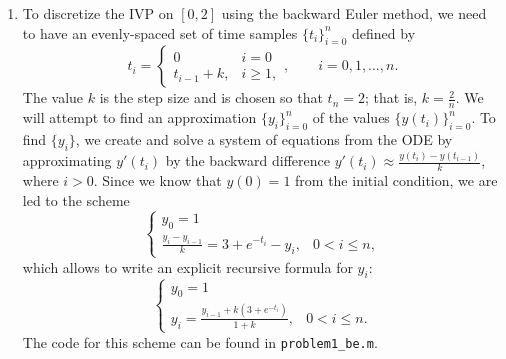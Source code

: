 \documentclass{homework}
\begin{document}
\begin{arabicparts}
		\questionpart
		\begin{enumerate}[label=({\bf\alph*})]
			\item To discretize the IVP on $[0,2]$ using the backward Euler method, we need to have an evenly-spaced set of time samples $\{t_i\}_{i=0}^n$ defined by
			\begin{equation}
				t_i = \begin{cases}
					0 & i = 0 \\
					t_{i-1} + k, & i \ge 1,
				\end{cases}, \qquad i = 0,1,\dots,n.
			\end{equation}
			The value $k$ is the step size and is chosen so that $t_n = 2$; that is, $k = \frac{2}{n}$. We will attempt to find an approximation $\{y_i\}_{i=0}^n$ of the values $\{y(t_i)\}_{i=0}^n$. To find $\{y_i\}$, we create and solve a system of equations from the ODE by approximating $y'(t_i)$ by the backward difference $y'(t_i) \approx \frac{y(t_i) - y(t_{i-1})}{k}$, where $i > 0$. Since we know that $y(0) = 1$ from the initial condition, we are led to the scheme
			\begin{equation}
				\begin{cases}
					y_0 = 1 &\\
					\frac{y_i - y_{i-1}}{k} = 3 + e^{-t_i} - y_i, & 0 < i \le n,
				\end{cases}
			\end{equation}
			which allows to write an explicit recursive formula for $y_i$:
			\begin{equation}
				\begin{cases}
					y_0 = 1 &\\
					y_i = \frac{y_{i-1} + k(3 + e^{-t_i})}{1+k}, & 0 < i \le n.
				\end{cases}
			\end{equation}
			The code for this scheme can be found in \lstinline{problem1_be.m}.
			

\end{enumerate}
\end{arabicparts}
\end{document}
